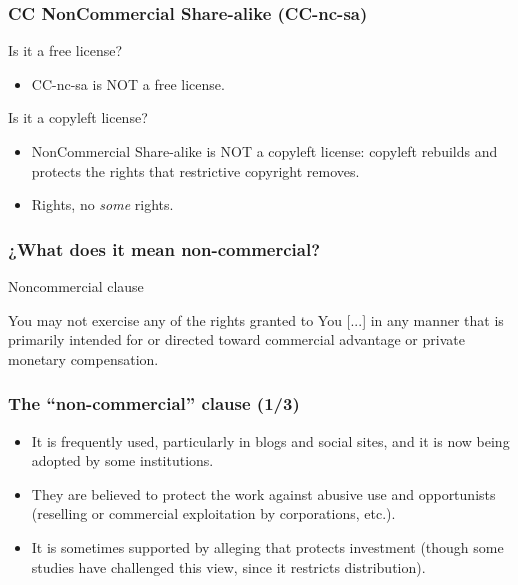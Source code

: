 \begin{frame}
\frametitle{CC NonCommercial Share-alike (CC-nc-sa)}

Is it a free license?
\pause

\begin{itemize}
\item CC-nc-sa is \alert{NOT} a free license.
\end{itemize}                                                 

\pause

Is it a copyleft license?
\pause

\begin{itemize}
\item NonCommercial Share-alike is \alert{NOT} a copyleft license: copyleft rebuilds and protects the rights that restrictive copyright removes.
\item Rights, no \textit{some} rights.
\end{itemize}                                                 

\end{frame}

\begin{frame}
\frametitle{¿What does it mean non-commercial?}

\begin{block}{Noncommercial clause}
\small

You may not exercise any of the rights granted to You [...] in any manner that is primarily intended for or directed toward commercial advantage or private monetary compensation. 

\end{block}

\end{frame}



\begin{frame}
\frametitle{The ``non-commercial'' clause (1/3)}

\begin{itemize}
\item It is frequently used, particularly in blogs and social sites, and it is now being adopted by some institutions.
\item They are believed to protect the work against abusive use and opportunists (reselling or commercial exploitation by corporations, etc.).
\item It is sometimes supported by alleging that protects investment (though some studies have challenged this view, since it restricts distribution).
\end{itemize}                                                 

\end{frame}

